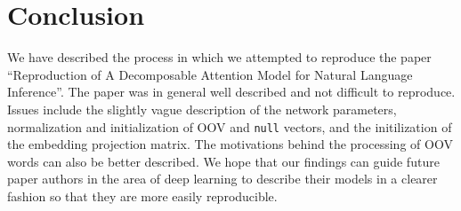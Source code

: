 \documentclass{article}
\begin{document}
\section{Conclusion}
We have described the process in which we attempted to reproduce the paper ``Reproduction of A Decomposable Attention Model for Natural Language Inference''. The paper was in general well described and not difficult to reproduce. Issues include the slightly vague description of the network parameters, normalization and initialization of OOV and \texttt{null} vectors, and the initilization of the embedding projection matrix. The motivations behind the processing of OOV words can also be better described. We hope that our findings can guide future paper authors in the area of deep learning to describe their models in a clearer fashion so that they are more easily reproducible.

{}

\end{document}
